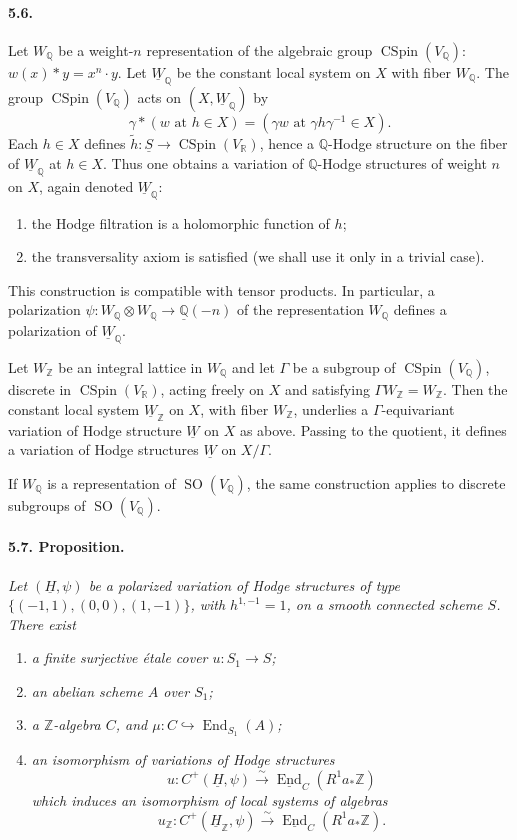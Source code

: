 \documentclass[10pt,leqno]{article}
\newcommand{\Q}{\mathbb{Q}}
\newcommand{\R}{\mathbb{R}}
\newcommand{\Z}{\mathbb{Z}}
\newcommand{\End}{\operatorname{End}}
\newcommand{\SO}{\operatorname{SO}}
\newcommand{\CSpin}{\operatorname{CSpin}}
\begin{document}
\paragraph{5.6.} Let $W_\Q$ be a weight-$n$ representation of the algebraic group $\CSpin(V_\Q)$: $w(x)*y=x^n\cdot y$. Let $\underline W_\Q$ be the constant local system on $X$ with fiber $W_\Q$. The group $\CSpin(V_\Q)$ acts on $(X,\underline W_\Q)$ by
\[
\gamma*(w\text{ at }h\in X)=(\gamma w\text{ at }\gamma h\gamma^{-1}\in X).
\]
Each $h\in X$ defines $\tilde h:\underline S\to\CSpin(V_\R)$, hence a $\Q$-Hodge structure on the fiber of $\underline W_\Q$ at $h\in X$. Thus one obtains a variation of $\Q$-Hodge structures of weight $n$ on $X$, again denoted $\underline W_\Q$:
\begin{enumerate}[label=\alph*)]
\item the Hodge filtration is a holomorphic function of $h$;
\item the transversality axiom is satisfied (we shall use it only in a trivial case).
\end{enumerate}
This construction is compatible with tensor products. In particular, a polarization $\psi:W_\Q\otimes W_\Q\to\underline{\Q}(-n)$ of the representation $W_\Q$ defines a polarization of $\underline W_\Q$.

Let $W_\Z$ be an integral lattice in $W_\Q$ and let $\Gamma$ be a subgroup of $\CSpin(V_\Q)$, discrete in $\CSpin(V_\R)$, acting freely on $X$ and satisfying $\Gamma W_\Z=W_\Z$. Then the constant local system $\underline W_\Z$ on $X$, with fiber $W_\Z$, underlies a $\Gamma$-equivariant variation of Hodge structure $\underline W$ on $X$ as above. Passing to the quotient, it defines a variation of Hodge structures $\underline W$ on $X/\Gamma$.

\clearpage

If $W_\Q$ is a representation of $\SO(V_\Q)$, the same construction applies to discrete subgroups of $\SO(V_\Q)$.

\paragraph{5.7. Proposition.} \emph{Let $(\underline H,\psi)$ be a polarized variation of Hodge structures of type $\{(-1,1),(0,0),(1,-1)\}$, with $h^{1,-1}=1$, on a smooth connected scheme $S$. There exist}
\begin{enumerate}[label=\alph*)]
\item \emph{a finite surjective étale cover $u:S_1\to S$;}
\item \emph{an abelian scheme $A$ over $S_1$;}
\item \emph{a $\Z$-algebra $C$, and $\mu:C\hookrightarrow\End_{S_1}(A)$;}
\item \emph{an isomorphism of variations of Hodge structures}
\[
u:C^+(\underline H,\psi)\xrightarrow{\sim}\underline{\End}_C(R^1a_*\Z)
\]
\emph{which induces an isomorphism of local systems of algebras}
\[
u_\Z:C^+(\underline H_\Z,\psi)\xrightarrow{\sim}\underline{\End}_C(R^1a_*\Z).
\]
\end{enumerate}
\end{document}
